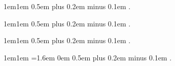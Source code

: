 \usepackage{amsthm}

    {1em}{1em}{}{}{\bfseries}{}%
    {0.5em plus 0.2em minus 0.1em}%
    {.}

\theoremstyle{mytheoremstyle}
\newtheorem{definition}{定义}[section]
\newtheorem{example}{例}[section]
\newtheorem{algorithm}{算法}[section]
\newtheorem*{sol}{解}
\newtheorem{question}{问题}[section]
\newtheorem*{answer}{解答}

    {1em}{1em}{\kaishu}{}{\bfseries}{}%
    {0.5em plus 0.2em minus 0.1em}%
    {.}

\theoremstyle{my2theoremstyle}
\newtheorem{theorem}{定理}[section]
\newtheorem{law}{定律}[section]
\newtheorem{corollary}{推论}
\newtheorem{proposition}{命题}
\newtheorem{lemma}{引理}
\newtheorem{axiom}{公理}
\newtheorem{property}{性质}

    {1em}{1em}{}{}{\kaishu}{}%
    {0.5em plus 0.2em minus 0.1em}%
    {.}

\theoremstyle{my3theoremstyle}
\newtheorem*{remark}{注}
\newtheorem*{cmt}{评注}
\newtheorem*{analysis}{分析}

    {1em}{1em}{
        \hangindent=1.6em
    }{0em}{}{}%
    {0.5em plus 0.2em minus 0.1em}%
    {.}

\theoremstyle{my4theoremstyle}
\newtheorem{exercise}{}[]

\renewenvironment{proof}{\par {\kaishu 证明.}\normalfont}{\qed\par}

